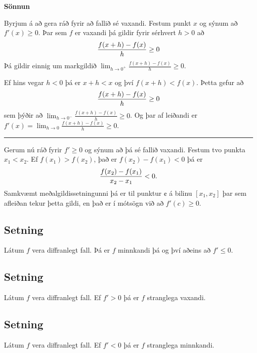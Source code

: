 \documentclass[a4paper,10pt,icelandic]{sphinxmanual}
\begin{document}
\textbf{Sönnun}

Byrjum á að gera ráð fyrir að fallið sé vaxandi. Festum punkt \(x\) og
sýnum að \(f'(x)\geq 0\). Þar sem \(f\) er vaxandi þá gildir fyrir
sérhvert \(h>0\) að
\begin{gather}
\begin{split}\frac{f(x+h)-f(x)}{h} \geq 0\end{split}\notag
\end{gather}
Þá gildir einnig um markgildið \(\lim_{h\to 0^+} \frac{f(x+h)-f(x)}h \geq 0\).

Ef hins vegar \(h<0\) þá er \(x+h < x\) og því
\(f(x+h)<f(x)\). Þetta gefur að
\begin{gather}
\begin{split}\frac{f(x+h)-f(x)}h \geq 0\end{split}\notag
\end{gather}
sem þýðir að \(\lim_{h\to 0^-} \frac{f(x+h)-f(x)}h \geq 0\). Og þar af leiðandi
er \(f'(x) = \lim_{h\to 0} \frac{f(x+h)-f(x)}h \geq 0\).


\bigskip\hrule{}\bigskip


Gerum nú ráð fyrir \(f'\geq 0\) og sýnum að þá sé fallið vaxandi.
Festum tvo punkta \(x_1 < x_2\). Ef \(f(x_1) > f(x_2)\), það er
\(f(x_2)-f(x_1)<0\)
þá er
\begin{gather}
\begin{split}\frac{f(x_2)-f(x_1)}{x_2-x_1} < 0.\end{split}\notag
\end{gather}
Samkvæmt meðalgildissetningunni þá er til punktur \(¢\) á bilinu \([x_1,x_2]\)
þar sem afleiðan tekur þetta gildi, en það er í mótsögn við að  \(f'(c)\geq 0\).


\subsection{Setning}
\label{kafli03:id16}\label{kafli03:minnkandieoae}
Látum \(f\) vera diffranlegt fall. Þá er \(f\) minnkandi þá og
því aðeins að \(f' \leq 0\).


\subsection{Setning}
\label{kafli03:id17}
Látum \(f\) vera diffranlegt fall. Ef \(f'>0\) þá er \(f\)
stranglega vaxandi.


\subsection{Setning}
\label{kafli03:id18}
Látum \(f\) vera diffranlegt fall. Ef \(f'<0\) þá er \(f\)
stranglega minnkandi.
\end{document}
